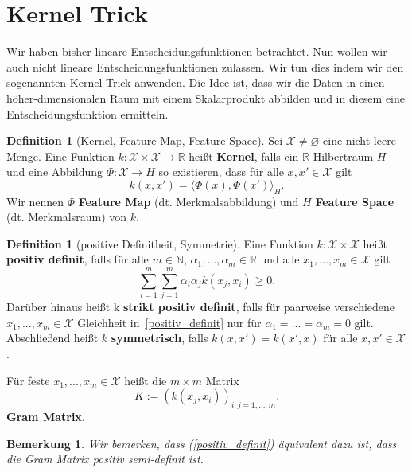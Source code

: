 \documentclass{article}
\theoremstyle{plain}
\newtheorem{bem}[thm]{Bemerkung}
\theoremstyle{definition}
\newtheorem{dfn}[thm]{Definition}
\begin{document}
\newpage

\section{Kernel Trick}\label{chapter_kernel}
Wir haben bisher lineare Entscheidungsfunktionen betrachtet. Nun wollen wir auch nicht lineare Entscheidungsfunktionen zulassen. Wir tun dies indem wir den sogenannten Kernel Trick anwenden. Die Idee ist, dass wir die Daten in einen höher-dimensionalen Raum mit einem Skalarprodukt abbilden und in diesem eine Entscheidungsfunktion ermitteln.

    \begin{dfn}[Kernel, Feature Map, Feature Space]
        Sei $\mathcal{X} \neq \varnothing$ eine nicht leere Menge.
        Eine Funktion $k: \mathcal{X} \times \mathcal{X} \to \mathbb{R}$ heißt \textbf{Kernel}, falls ein $\mathbb{R}$-Hilbertraum $H$ und eine Abbildung $\Phi: \mathcal{X} \to H$ so existieren, dass für alle $x, x' \in \mathcal{X}$ gilt
        \[
            k(x,x') = \langle \Phi(x), \Phi(x') \rangle_{H}.
        \]
        Wir nennen $\Phi$ \textbf{Feature Map} (dt. Merkmalsabbildung) und $H$ \textbf{Feature Space} (dt. Merkmalsraum) von $k$.
    \end{dfn}
    
    \begin{dfn}[positive Definitheit, Symmetrie]
        Eine Funktion $k: \mathcal{X} \times \mathcal{X}$ heißt \textbf{positiv definit}, falls für alle $m \in \mathbb{N}$, $\alpha_1, ..., \alpha_m \in \mathbb{R}$ und alle $x_1, ..., x_m \in \mathcal{X}$ gilt
        \begin{equation}\label{positiv_definit}
            \sum_{i=1}^{m} \sum_{j=1}^{m} \alpha_i \alpha_j k(x_j,x_i) \geq 0.
        \end{equation}
        Darüber hinaus heißt k \textbf{strikt positiv definit}, falls für paarweise verschiedene $x_1, ..., x_m \in \mathcal{X}$ Gleichheit in~\ref{positiv_definit} nur für $\alpha_1=...=\alpha_m=0$ gilt. \\
        Abschließend heißt $k$ \textbf{symmetrisch}, falls $k(x,x')=k(x',x)$ für alle $x,x' \in \mathcal{X}$.
    \end{dfn}
    Für feste $x_1, ..., x_m \in \mathcal{X}$ heißt die $m \times m$ Matrix
    \[
        K := (k(x_j,x_i))_{i,j = 1,..., m}.
    \]
    \textbf{Gram Matrix}. \\
    
    \begin{bem} \label{pos_def}
        Wir bemerken, dass (\ref{positiv_definit}) äquivalent dazu ist, dass die Gram Matrix positiv semi-definit ist.
    \end{bem}
    
\end{document}
